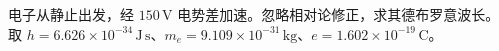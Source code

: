 电子从静止出发，经 $150\,\mathrm V$ 电势差加速。忽略相对论修正，求其德布罗意波长。取 $h=6.626\times10^{-34}\,\mathrm{J\,s}$、$m_e=9.109\times10^{-31}\,\mathrm{kg}$、$e=1.602\times10^{-19}\,\mathrm C$。
